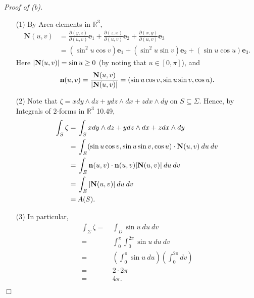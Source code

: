 \documentclass{article}
\begin{document}
\emph{Proof of (b).}
\begin{enumerate}
\item[(1)]
  By Area elements in $\mathbb{R}^3$,
  \begin{align*}
    \mathbf{N}(u,v)
    &= \frac{\partial(y,z)}{\partial(u,v)} \mathbf{e}_1
      + \frac{\partial(z,x)}{\partial(u,v)} \mathbf{e}_2
      + \frac{\partial(x,y)}{\partial(u,v)}\mathbf{e}_3 \\
    &= (\sin^2 u \cos v) \mathbf{e}_1
      + (\sin^2 u \sin v) \mathbf{e}_2
      + (\sin u \cos u) \mathbf{e}_3.
  \end{align*}
  Here
  $\abs{\mathbf{N}(u,v)} = \sin u \geq 0$ (by noting that $u \in [0,\pi]$),
  and
  \[
    \mathbf{n}(u,v)
    = \frac{\mathbf{N}(u,v)}{ \abs{\mathbf{N}(u,v)} }
    = (\sin u \cos v, \sin u \sin v, \cos u).
  \]

\item[(2)]
  Note that $\zeta = x dy \wedge dz + y dz \wedge dx + z dx \wedge dy$ on $S \subseteq \Sigma$.
  Hence,
  by Integrals of $2$-forms in $\mathbb{R}^3$ 10.49,
  \begin{align*}
    \int_{S} \zeta
    =& \: \int_{S} x dy \wedge dz + y dz \wedge dx + z dx \wedge dy \\
    =& \: \int_{E} (\sin u \cos v, \sin u \sin v, \cos u) \cdot \mathbf{N}(u,v) \: du \: dv \\
    =& \: \int_{E} \mathbf{n}(u,v) \cdot \mathbf{n}(u,v) \abs{\mathbf{N}(u,v)} \: du \: dv \\
    =& \: \int_{E} \abs{\mathbf{N}(u,v)} \: du \: dv \\
    =& \: A(S).
  \end{align*}

\item[(3)]
  In particular,
  \begin{align*}
    \int_{\Sigma} \zeta
    =& \: \int_{D} \sin u \: du \: dv \\
    =& \: \int_{0}^{\pi} \int_{0}^{2\pi} \sin u \: du \: dv \\
    =& \: \left( \int_{0}^{\pi} \sin u \: du \right)
      \left( \int_{0}^{2\pi} dv \right) \\
    =& \: 2 \cdot 2 \pi \\
    =& \: 4 \pi.
  \end{align*}
\end{enumerate}
$\Box$ \\
\end{document}
